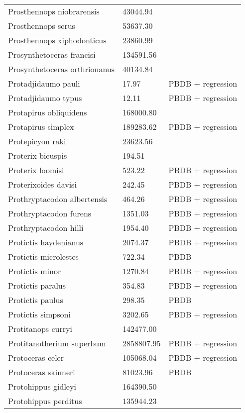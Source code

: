 \documentclass{article}
\begin{document}
\begin{center}
\begin{longtable}{p{} p{} p{} }
  Prosthennops niobrarensis & 43044.94 & \cite{Tomiya2013} \\ 
  Prosthennops serus & 53637.30 & \cite{Tomiya2013} \\ 
  Prosthennops xiphodonticus & 23860.99 & \cite{Tomiya2013} \\ 
  Prosynthetoceras francisi & 134591.56 & \cite{Tomiya2013} \\ 
  Prosynthetoceras orthrionanus & 40134.84 & \cite{Tomiya2013} \\ 
  Protadjidaumo pauli & 17.97 & PBDB + regression \\ 
  Protadjidaumo typus & 12.11 & PBDB + regression \\ 
  Protapirus obliquidens & 168000.80 & \cite{Rose1982a} \\ 
  Protapirus simplex & 189283.62 & PBDB + regression \\ 
  Protepicyon raki & 23623.56 & \cite{Tomiya2013} \\ 
  Proterix bicuspis & 194.51 & \cite{Coombs1979} \\ 
  Proterix loomisi & 523.22 & PBDB + regression \\ 
  Proterixoides davisi & 242.45 & PBDB + regression \\ 
  Prothryptacodon albertensis & 464.26 & PBDB + regression \\ 
  Prothryptacodon furens & 1351.03 & PBDB + regression \\ 
  Prothryptacodon hilli & 1954.40 & PBDB + regression \\ 
  Protictis haydenianus & 2074.37 & PBDB + regression \\ 
  Protictis microlestes & 722.34 & PBDB \\ 
  Protictis minor & 1270.84 & PBDB + regression \\ 
  Protictis paralus & 354.83 & PBDB + regression \\ 
  Protictis paulus & 298.35 & PBDB \\ 
  Protictis simpsoni & 3202.65 & PBDB + regression \\ 
  Protitanops curryi & 142477.00 & \cite{McKenna2011} \\ 
  Protitanotherium superbum & 2858807.95 & PBDB + regression \\ 
  Protoceras celer & 105068.04 & PBDB + regression \\ 
  Protoceras skinneri & 81023.96 & PBDB \\ 
  Protohippus gidleyi & 164390.50 & \cite{Tomiya2013} \\ 
  Protohippus perditus & 135944.23 & \cite{Tomiya2013} \\ 

\end{longtable}
\end{center}
\end{document}
